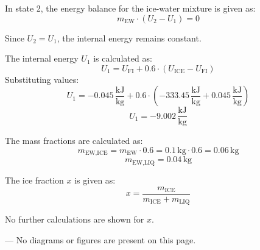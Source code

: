 In state 2, the energy balance for the ice-water mixture is given as:  
\[
m_{\text{EW}} \cdot (U_2 - U_1) = 0
\]  

Since \( U_2 = U_1 \), the internal energy remains constant.  

The internal energy \( U_1 \) is calculated as:  
\[
U_1 = U_{\text{FI}} + 0.6 \cdot (U_{\text{ICE}} - U_{\text{FI}})
\]  
Substituting values:  
\[
U_1 = -0.045 \, \frac{\text{kJ}}{\text{kg}} + 0.6 \cdot (-333.45 \, \frac{\text{kJ}}{\text{kg}} + 0.045 \, \frac{\text{kJ}}{\text{kg}})
\]  
\[
U_1 = -9.002 \, \frac{\text{kJ}}{\text{kg}}
\]  

The mass fractions are calculated as:  
\[
m_{\text{EW,ICE}} = m_{\text{EW}} \cdot 0.6 = 0.1 \, \text{kg} \cdot 0.6 = 0.06 \, \text{kg}
\]  
\[
m_{\text{EW,LIQ}} = 0.04 \, \text{kg}
\]  

The ice fraction \( x \) is given as:  
\[
x = \frac{m_{\text{ICE}}}{m_{\text{ICE}} + m_{\text{LIQ}}}
\]  

No further calculations are shown for \( x \).  

---  
No diagrams or figures are present on this page.